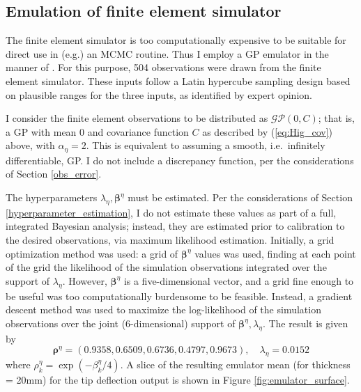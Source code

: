 \documentclass{article}
\begin{document}
\subsection{Emulation of finite element simulator}\label{emulator}
The finite element simulator is too computationally expensive to be suitable for direct use in (e.g.) an MCMC routine. Thus I employ a GP emulator in the manner of \cite{Williams2006}. For this purpose, 504 observations were drawn from the finite element simulator. These inputs follow a Latin hypercube sampling design \citep{McKay1979} based on plausible ranges for the three inputs, as identified by expert opinion.

I consider the finite element observations to be distributed as $\mathcal{GP}(0,C)$; that is, a GP with mean 0 and covariance function $C$ as described by (\ref{eq:Hig_cov}) above, with $\alpha_\eta=2$. This is equivalent to assuming a smooth, i.e.\ infinitely differentiable, GP. I do not include a discrepancy function, per the considerations of Section \ref{obs_error}.

The hyperparameters $\lambda_\eta,\boldsymbol \beta^\eta$ must be estimated. Per the considerations of Section \ref{hyperparameter_estimation}, I do not estimate these values as part of a full, integrated Bayesian analysis; instead, they are estimated prior to calibration to the desired observations, via maximum likelihood estimation. Initially, a grid optimization method was used: a grid of $\boldsymbol \beta^\eta$ values was used, finding at each point of the grid the likelihood of the simulation observations integrated over the support of $\lambda_\eta$. However, $\boldsymbol \beta^\eta$ is a five-dimensional vector, and a grid fine enough to be useful was too computationally burdensome to be feasible. Instead, a gradient descent method \citep{Cauchy1847} was used to maximize the log-likelihood of the simulation observations over the joint (6-dimensional) support of $\boldsymbol \beta^\eta,\lambda_\eta$.  The result is given by
\begin{equation}\label{eq:MLEs}
\boldsymbol \rho^\eta = (0.9358, 0.6509, 0.6736, 0.4797, 0.9673),\quad
\lambda_\eta = 0.0152
\end{equation}
where $\rho^\eta_k = \exp(-\beta_k^\eta/4)$. A slice of the resulting emulator mean (for thickness = 20mm) for the tip deflection output is shown in Figure \ref{fig:emulator_surface}.
\end{document}
